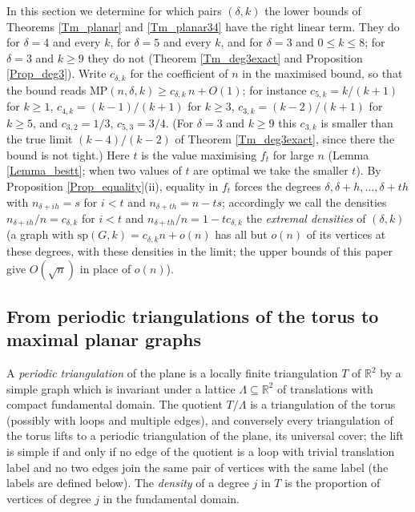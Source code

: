 \documentclass[12pt,a4paper]{article}%
\begin{document}
In this section we determine for which pairs $(\delta ,k)$ the lower bounds of Theorems \ref{Tm_planar} and
\ref{Tm_planar34} have the right linear term. They do for $\delta =4$ and every $k$, for $\delta =5$ and
every $k$, and for $\delta =3$ and $0\leq k\leq 8$; for $\delta =3$ and $k\geq 9$ they do not
(Theorem \ref{Tm_deg3exact} and Proposition \ref{Prop_deg3}).
Write $c_{\delta ,k}$ for the coefficient of $n$ in the maximised bound, so that the bound reads
$\mathrm{MP}(n,\delta ,k)\geq c_{\delta ,k}\,n+O(1)$; for instance $c_{5,k}=k/(k+1)$ for $k\geq 1$, $c_{4,k}=(k-1)/(k+1)$ for
$k\geq 3$, $c_{3,k}=(k-2)/(k+1)$ for $k\geq 5$, and $c_{3,2}=1/3$, $c_{5,3}=3/4$. (For $\delta =3$ and $k\geq 9$ this $c_{3,k}$ is smaller than the true limit $(k-4)/(k-2)$ of Theorem \ref{Tm_deg3exact}, since there the bound is not tight.) Here $t$ is the value
maximising $f_{t}$ for large $n$ (Lemma \ref{Lemma_bestt}; when two values of $t$ are optimal we take the smaller $t$). By
Proposition \ref{Prop_equality}(ii), equality in $f_{t}$ forces the degrees $\delta ,\delta +h,\ldots ,\delta +th$ with
$n_{\delta +ih}=s$ for $i<t$ and $n_{\delta +th}=n-ts$; accordingly we call the densities $n_{\delta +ih}/n=c_{\delta ,k}$
for $i<t$ and $n_{\delta +th}/n=1-tc_{\delta ,k}$ the \emph{extremal densities} of $(\delta ,k)$ (a graph with
$\mathrm{sp}(G,k)=c_{\delta ,k}n+o(n)$ has all but $o(n)$ of its vertices at these degrees, with these
densities in the limit; the upper bounds of this paper give $O(\sqrt{n})$ in place of $o(n)$).

\subsection{From periodic triangulations of the torus to maximal planar graphs}

A \emph{periodic triangulation} of the plane is a locally finite triangulation $T$ of $\mathbb{R}^{2}$ by a simple
graph which is invariant under a lattice $\Lambda \subseteq \mathbb{R}^{2}$ of translations with compact fundamental
domain. The quotient $T/\Lambda $ is a triangulation of the torus (possibly with loops and multiple edges), and
conversely every triangulation of the torus lifts to a periodic triangulation of the plane, its universal cover; the
lift is simple if and only if no edge of the quotient is a loop with trivial translation label and no two edges join
the same pair of vertices with the same label (the labels are defined below). The \emph{density} of a degree $j$ in
$T$ is the proportion of vertices of degree $j$ in the fundamental domain.
\end{document}
